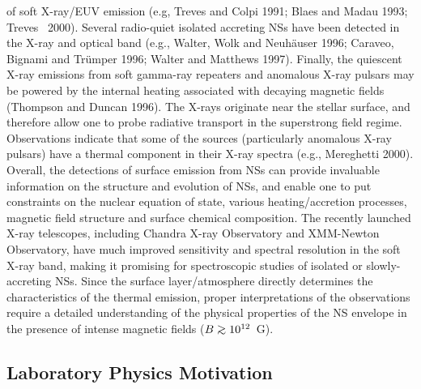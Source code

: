 of soft X-ray/EUV emission (e.g, Treves and Colpi 1991; 
Blaes and Madau 1993; Treves \etal~2000). 
Several radio-quiet isolated accreting NSs have been
detected in the X-ray and optical band (e.g.,
Walter, Wolk and Neuh\"auser 1996; Caraveo, Bignami and Tr\"umper 1996; 
Walter and Matthews 1997).
Finally, the quiescent X-ray emissions from soft gamma-ray repeaters 
and anomalous X-ray pulsars may be powered by the internal heating 
associated with decaying magnetic fields (Thompson and Duncan 1996).
The X-rays originate near the stellar surface, and therefore allow one 
to probe radiative transport in the superstrong field regime. 
Observations indicate that some of the sources (particularly anomalous 
X-ray pulsars) have a thermal component in their X-ray spectra (e.g.,
Mereghetti 2000).
Overall, the detections of surface emission from NSs
can provide invaluable information on the structure and evolution 
of NSs, and enable one to put constraints on the nuclear 
equation of state, various heating/accretion processes, magnetic field
structure and surface chemical composition. 
The recently launched X-ray telescopes, including Chandra X-ray 
Observatory and XMM-Newton Observatory, have much improved 
sensitivity and spectral resolution in the soft X-ray band, 
making it promising for spectroscopic studies of isolated or 
slowly-accreting NSs. Since the surface layer/atmosphere directly determines
the characteristics of the thermal emission, proper interpretations of
the observations require a detailed understanding of the physical properties of
the NS envelope in the presence of intense magnetic fields ($B\go 10^{12}$~G).


\subsection{Laboratory Physics Motivation}


